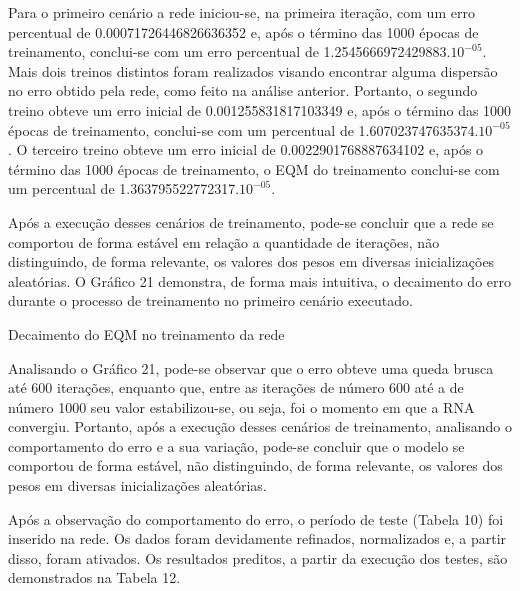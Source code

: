 Para o primeiro cenário a rede iniciou-se, na primeira iteração, com um erro percentual de 0.00071726446826636352 e, após o término das 1000 épocas de treinamento, conclui-se com um erro percentual de 1.2545666972429883.$10^{-05}$. Mais dois treinos distintos foram realizados visando encontrar alguma dispersão no erro obtido pela rede, como feito na análise anterior. Portanto, o segundo treino obteve um erro inicial de 0.001255831817103349 e, após o término das 1000 épocas de treinamento, conclui-se com um percentual de 1.607023747635374.$10^{-05}$. O terceiro treino obteve um erro inicial de 0.0022901768887634102 e, após o término das 1000 épocas de treinamento, o EQM do treinamento conclui-se com um percentual de 1.363795522772317.$10^{-05}$.

Após a execução desses cenários de treinamento, pode-se concluir que a rede se comportou de forma estável em relação a quantidade de iterações, não distinguindo, de forma relevante, os valores dos pesos em diversas inicializações aleatórias. O Gráfico 21 demonstra, de forma mais intuitiva, o decaimento do erro durante o processo de treinamento no primeiro cenário executado.

\begin{grafico}[h]
	\centering
	\caption{Decaimento do EQM no treinamento da rede}
	\label{lingua}
\end{grafico}

Analisando o Gráfico 21, pode-se observar que o erro obteve uma queda brusca até 600 iterações, enquanto que, entre as iterações de número 600 até a de número 1000 seu valor estabilizou-se, ou seja, foi o momento em que a RNA convergiu. Portanto, após a execução desses cenários de treinamento, analisando o comportamento do erro e a sua variação, pode-se concluir que o modelo se comportou de forma estável, não distinguindo, de forma relevante, os valores dos pesos em diversas inicializações aleatórias.

Após a observação do comportamento do erro, o período de teste (Tabela 10) foi inserido na rede. Os dados foram devidamente refinados, normalizados e, a partir disso, foram ativados. Os resultados preditos, a partir da execução dos testes, são demonstrados na Tabela 12. 

